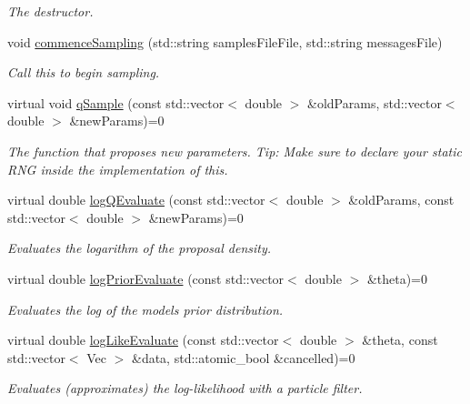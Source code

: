 \begin{DoxyCompactItemize}
\begin{DoxyCompactList}\small\item\em The destructor. \end{DoxyCompactList}\item 
void \hyperlink{classPmmh_a83177100969ff29bc522b6d149ee2392}{commence\+Sampling} (std\+::string samples\+File\+File, std\+::string messages\+File)
\begin{DoxyCompactList}\small\item\em Call this to begin sampling. \end{DoxyCompactList}\item 
virtual void \hyperlink{classPmmh_ab8527fd052ddaa434b8b4ab9715d503f}{q\+Sample} (const std\+::vector$<$ double $>$ \&old\+Params, std\+::vector$<$ double $>$ \&new\+Params)=0
\begin{DoxyCompactList}\small\item\em The function that proposes new parameters. Tip\+: Make sure to declare your static R\+NG inside the implementation of this. \end{DoxyCompactList}\item 
virtual double \hyperlink{classPmmh_a9948772ed9f9e1024302c524641d9915}{log\+Q\+Evaluate} (const std\+::vector$<$ double $>$ \&old\+Params, const std\+::vector$<$ double $>$ \&new\+Params)=0
\begin{DoxyCompactList}\small\item\em Evaluates the logarithm of the proposal density. \end{DoxyCompactList}\item 
virtual double \hyperlink{classPmmh_ada5cc8317bd91ca129909abe0ec2cd1b}{log\+Prior\+Evaluate} (const std\+::vector$<$ double $>$ \&theta)=0
\begin{DoxyCompactList}\small\item\em Evaluates the log of the model\textquotesingle{}s prior distribution. \end{DoxyCompactList}\item 
virtual double \hyperlink{classPmmh_a4a66167bea425f5d271ef7931f4a3e5f}{log\+Like\+Evaluate} (const std\+::vector$<$ double $>$ \&theta, const std\+::vector$<$ Vec $>$ \&data, std\+::atomic\+\_\+bool \&cancelled)=0
\begin{DoxyCompactList}\small\item\em Evaluates (approximates) the log-\/likelihood with a particle filter. \end{DoxyCompactList}\end{DoxyCompactItemize}

